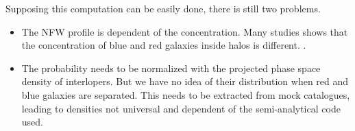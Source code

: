 Supposing this computation can be easily done, there is still two problems.
\begin{itemize}
    \item The NFW profile is dependent of the concentration. Many studies
        shows that the concentration of blue and red galaxies inside halos
        is different. .
    \item The probability needs to be normalized with the projected phase
        space density of interlopers. But we have no idea of their
        distribution when red and blue galaxies are separated. This needs to
        be extracted from mock catalogues, leading to densities not
        universal and dependent of the semi-analytical code used.
\end{itemize}



